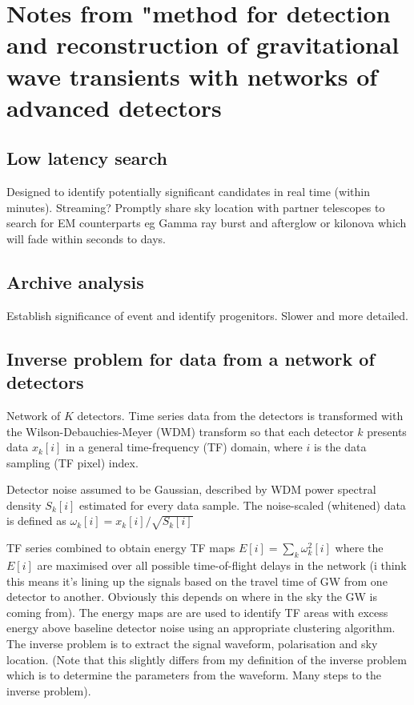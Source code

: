 \section{Notes from "method for detection and reconstruction of gravitational wave transients with networks of advanced detectors}
\subsection{Low latency search}
Designed to identify potentially significant candidates in real time (within minutes). Streaming? Promptly share sky location with partner telescopes to search for EM counterparts eg Gamma ray burst and afterglow or kilonova which will fade within seconds to days. 

\subsection{Archive analysis}
Establish significance of event and identify progenitors. Slower and more detailed. 

\subsection{Inverse problem for data from a network of detectors}
Network of $K$ detectors. Time series data from the detectors is transformed with the Wilson-Debauchies-Meyer (WDM) transform so that each detector $k$ presents data $x_k[i]$ in a general time-frequency (TF) domain, where $i$ is the data sampling (TF pixel) index. 

Detector noise assumed to be Gaussian, described by WDM power spectral density $S_k[i]$ estimated for every data sample. The noise-scaled (whitened) data is defined as $\omega_k[i] = x_k[i]/\sqrt{S_k[i]}$

TF series combined to obtain energy TF maps $E[i]=\sum_k \omega^2_k [i]$ where the $E[i]$ are maximised over all possible time-of-flight delays in the network (i think this means it's lining up the signals based on the travel time of GW from one detector to another. Obviously this depends on where in the sky the GW is coming from). The energy maps are are used to identify TF areas with excess energy above baseline detector noise using an appropriate clustering algorithm. The inverse problem is to extract the signal waveform, polarisation and sky location. (Note that this slightly differs from my definition of the inverse problem which is to determine the parameters from the waveform. Many steps to the inverse problem). 

